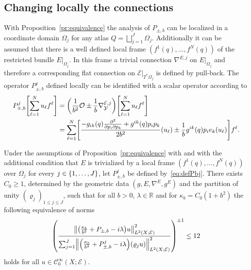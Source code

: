 \documentclass[AHL,Unicode,longabstracts]{cedram}
\newcommand{\R}{\mathbb{R}}
\newcommand{\clC}{\mathcal{C}}
\newcommand{\clY}{\mathcal{Y}}
\newcommand{\clO}{\mathcal{O}}
\newcommand{\clE}{\mathcal{E}}
\newcommand\norm[1]{\left\lVert#1\right\rVert}
\let\originalleft\left
\let\originalright\right
\renewcommand{\left}{\mathopen{}\mathclose\bgroup\originalleft}
\renewcommand{\right}{\aftergroup\egroup\originalright}
\begin{document}
\subsection{Changing locally the connections}\label{sec:locchangeconnec}

With Proposition~\ref{pr:equivalence} the analysis of $P_{\pm,b}$ can be localized in a coordinate domain $\Omega_{j}$ for any atlas $Q=\bigsqcup_{j=1}^{J}\Omega_{j}$. Additionally it can be assumed that there is a well defined local frame $(f^{1}(q),\dots,f^{N}(q))$ of the restricted bundle $E|_{\Omega_{j}}$. In this frame a trivial connection $\nabla^{E,j}$ on $E|_{\Omega_{j}}$ and therefore a corresponding flat connection on $\clE|_{T^{*}\Omega_{j}}$ is defined by pull-back. The operator $P_{\pm, b}^{j}$ defined locally can be identified with a scalar operator according to
\begin{equation}\label{eq:defPbj}
\begin{aligned}[t]
P_{\pm,b}^{j}\left[\sum_{\ell=1}^{N}u_{\ell}f^{\ell}\right]&=
\left(\frac{1}{b^{2}}\clO\pm \frac{1}{b}\nabla^{\clE,j}_{\clY}\right)\left[\sum_{\ell=1}^{N}u_{\ell}f^{\ell}\right]
\\
&=\sum_{\ell=1}^{N}
\left[\frac{-g_{ik}(q)\frac{\partial^{2}}{\partial p_{i}\partial p_{k}}+ g^{ik}(q)p_{i}p_{k}}{2b^{2}}(u_{\ell})
\pm \frac{1}{b}g^{ik}(q)p_{i}e_{k}(u_{\ell})\right]f^{\ell} .
\end{aligned}
\end{equation}
\begin{prop}\label{pr:locscalPb}
Under the assumptions of Proposition~\ref{pr:equivalence} with and with the additional condition that $E$ is trivialized by a local frame $(f^{1}(q),\dots, f^{N}(q))$ over $\Omega_{j}$ for every $j\in \left\{1,\dots,J\right\}$, let $P_{\pm, b}^{j}$ be defined by~\eqref{eq:defPbj}. There exists $C_{0}\geq 1$, determined by the geometric data $(g,E,\nabla^{E},g^{E})$ and the partition of unity $(\varrho_{j})_{1\leq j\leq J}$, such that for all $b>0$, $\lambda\in \R$ and for $\kappa_{b}=C_{0}(1+b^{2})$ the following equivalence of norms
\begin{equation}\label{eq:locscalPb}
\left(
\frac{\norm{\left(\frac{\kappa_{b}}{b^{2}}+P_{\pm, b}-i\lambda\right)u}^{2}_{L^{2}(X;\clE)}} {\sum_{j=1}^{J}\norm{\left(\frac{\kappa_{b}}{b^{2}}+P^{j}_{\pm,b}-i\lambda\right)(\varrho_{j}u)}^{2}_{L^{2}(X;\clE)}}
\right)^{\pm 1}\leq 12
\end{equation}
holds for all $ u\in \clC^{\infty}_{0}(X;\clE)$.
\end{prop}
\end{document}
